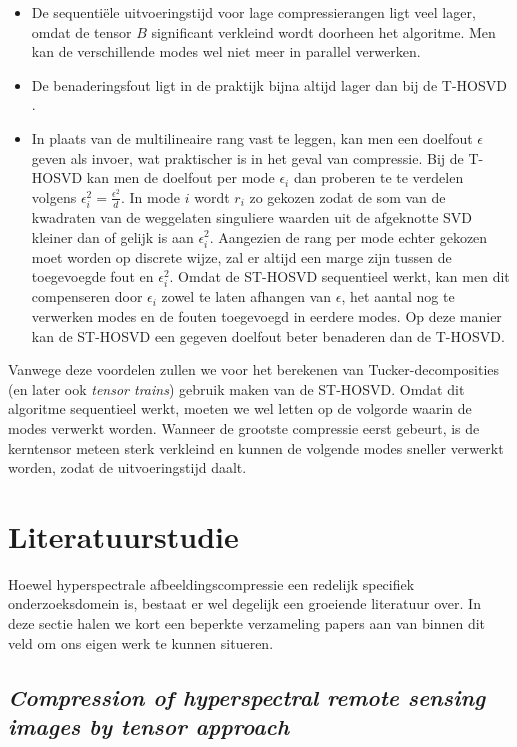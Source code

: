 \begin{itemize}
\item De sequenti\"ele uitvoeringstijd voor lage compressierangen ligt veel lager, omdat de tensor $B$ significant verkleind wordt doorheen het algoritme. Men kan de verschillende modes wel niet meer in parallel verwerken.
\item De benaderingsfout ligt in de praktijk bijna altijd lager dan bij de T-HOSVD \cite{ref:st_hosvd}.
\item In plaats van de multilineaire rang vast te leggen, kan men een doelfout $\epsilon$ geven als invoer, wat praktischer is in het geval van compressie. Bij de T-HOSVD kan men de doelfout per mode $\epsilon_i$ dan proberen te te verdelen volgens $\epsilon_i^2 = \frac{\epsilon^2}{d}$. In mode $i$ wordt $r_i$ zo gekozen zodat de som van de kwadraten van de weggelaten singuliere waarden uit de afgeknotte SVD kleiner dan of gelijk is aan $\epsilon_i^2$. Aangezien de rang per mode echter gekozen moet worden op discrete wijze, zal er altijd een marge zijn tussen de toegevoegde fout en $\epsilon_i^2$. Omdat de ST-HOSVD sequentieel werkt, kan men dit compenseren door $\epsilon_i$ zowel te laten afhangen van $\epsilon$, het aantal nog te verwerken modes en de fouten toegevoegd in eerdere modes. Op deze manier kan de ST-HOSVD een gegeven doelfout beter benaderen dan de T-HOSVD.
\end{itemize}

Vanwege deze voordelen zullen we voor het berekenen van Tucker-decomposities (en later ook \textit{tensor trains}) gebruik maken van de ST-HOSVD. Omdat dit algoritme sequentieel werkt, moeten we wel letten op de volgorde waarin de modes verwerkt worden. Wanneer de grootste compressie eerst gebeurt, is de kerntensor meteen sterk verkleind en kunnen de volgende modes sneller verwerkt worden, zodat de uitvoeringstijd daalt.

\section{Literatuurstudie}

Hoewel hyperspectrale afbeeldingscompressie een redelijk specifiek onderzoeksdomein is, bestaat er wel degelijk een groeiende literatuur over. In deze sectie halen we kort een beperkte verzameling papers aan van binnen dit veld om ons eigen werk te kunnen situeren.

\subsection{\textit{Compression of hyperspectral remote sensing images by tensor approach}}

